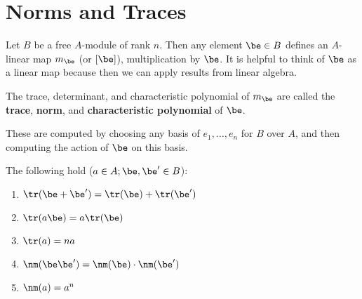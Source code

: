 \section{Norms and Traces}
Let $B$ be a free $A$-module of rank $n$. Then any element $\be\in B$ defines an $A$-linear map $m_{\be}$ (or $[\be]$), multiplication by $\be$. It is helpful to think of $\be$ as a linear map because then we can apply results from linear algebra.
\begin{df}
The trace, determinant, and characteristic polynomial of $m_{\be}$ are called the {\textbf{trace}}, {\textbf{norm}}, and {\textbf{characteristic polynomial}} of $\be$.
\end{df}
These are computed by choosing any basis of $e_1,\ldots, e_n$ for $B$ over $A$, and then computing the action of $\be$ on this basis.
\begin{pr}
The following hold ($a\in A; \be,\be'\in B$):
\begin{enumerate}
\item $\tr(\be+\be')=\tr(\be)+\tr(\be')$
\item $\tr(a\be)=a\tr(\be)$
\item $\tr(a)=na$
\item $\nm(\be\be')=\nm(\be)\cdot \nm (\be')$
\item $\nm(a)=a^n$
\end{enumerate}
\end{pr}
